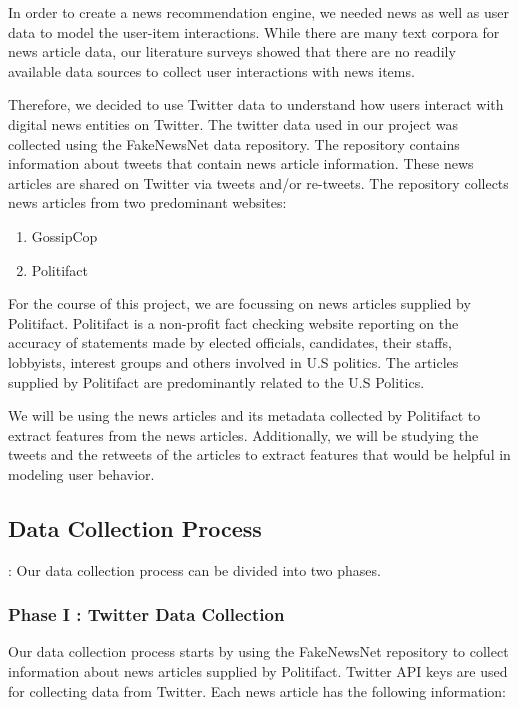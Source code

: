 \documentclass{article}
\begin{document}
In order to create a news recommendation engine, we needed news as well as user data to model the user-item interactions. While there are many text corpora for news article data, our literature surveys showed that there are no readily available data sources to collect user interactions with news items. 

Therefore, we decided to use Twitter data to understand how users interact with digital news entities on Twitter. 
The twitter data used in our project was collected using the FakeNewsNet \cite{fakenewsdata} data repository. The repository contains information about tweets that contain news article information. These news articles are shared on Twitter via tweets and/or re-tweets. The repository collects news articles from two predominant websites:
\begin{enumerate}
\item GossipCop
\item Politifact
\end{enumerate}

For the course of this project, we are focussing on news articles supplied by Politifact. Politifact is a non-profit fact checking website reporting on the accuracy of statements made by elected officials, candidates, their staffs, lobbyists, interest groups and others involved in U.S politics. The articles supplied by Politifact are predominantly related to the U.S Politics. 

We will be using the news articles and its metadata collected by Politifact to extract features from the news articles. Additionally, we will be studying the tweets and the retweets of the articles to extract features that would be helpful in modeling user behavior. \\

\subsection{Data Collection Process}:
Our data collection process can be divided into two phases.

\subsubsection{Phase I : Twitter Data Collection}
Our data collection process starts by using the FakeNewsNet \cite{fakenewsnet} repository to collect information about news articles supplied by Politifact. Twitter API keys are used for collecting data from Twitter.
Each news article has the following information:
\end{document}
